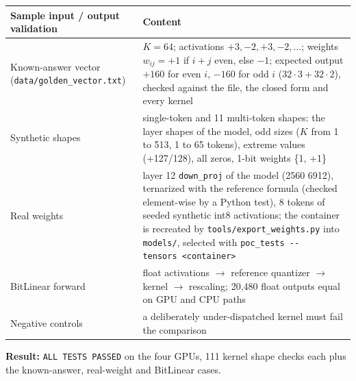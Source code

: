 \documentclass[
  10pt,
]{article}
\newcounter{none} %
\begin{document}
{\def\LTcaptype{none} %
\begin{longtable}[]{@{}
  >{\raggedright\arraybackslash}p{}
  >{\raggedright\arraybackslash}p{}@{}}
\toprule\noalign{}
\begin{minipage}[b]{\linewidth}\raggedright%
Sample input / output validation
\end{minipage} & \begin{minipage}[b]{\linewidth}\raggedright%
Content
\end{minipage} \\
\midrule\noalign{}
\endhead%
\bottomrule\noalign{}
\endlastfoot%
Known-answer vector (\texttt{data/golden\_vector.txt}) & \(K = 64\);
activations \(+3, -2, +3, -2, \dots\); weights \(w_{ij} = +1\) if
\(i + j\) even, else \(-1\); expected output \(+160\) for even \(i\),
\(-160\) for odd \(i\) (\(32 \cdot3 + 32 \cdot2\)), checked against
the file, the closed form and every kernel \\
Synthetic shapes & 9 single-token and 11 multi-token shapes: the layer
shapes of the model, odd sizes (\(K\) from 1 to 513, 1 to 65 tokens),
extreme values (+127/\textminus{}128), all zeros, 1-bit weights \{\textminus{}1, +1\} \\
Real weights & layer 12 \texttt{down\_proj} of the model (2560 \texttimes{} 6912),
ternarized with the reference formula (checked element-wise by a Python
test), 8 tokens of seeded synthetic int8 activations; the container is
recreated by
\texttt{tools/export\_weights.py} into \texttt{models/}, selected with
\texttt{poc\_tests\ -{}-tensors\ \textless{}container\textgreater{}} \\
BitLinear forward & float activations $\rightarrow$ reference quantizer $\rightarrow$ kernel $\rightarrow$
rescaling; 20,480 float outputs equal on GPU and CPU paths \\
Negative controls & a deliberately under-dispatched kernel must fail the
comparison \\
\end{longtable}
}

\textbf{Result:} \texttt{ALL\ TESTS\ PASSED} on the four GPUs, 111
kernel \texttimes{} shape checks each plus the known-answer, real-weight and
BitLinear cases.
\end{document}
